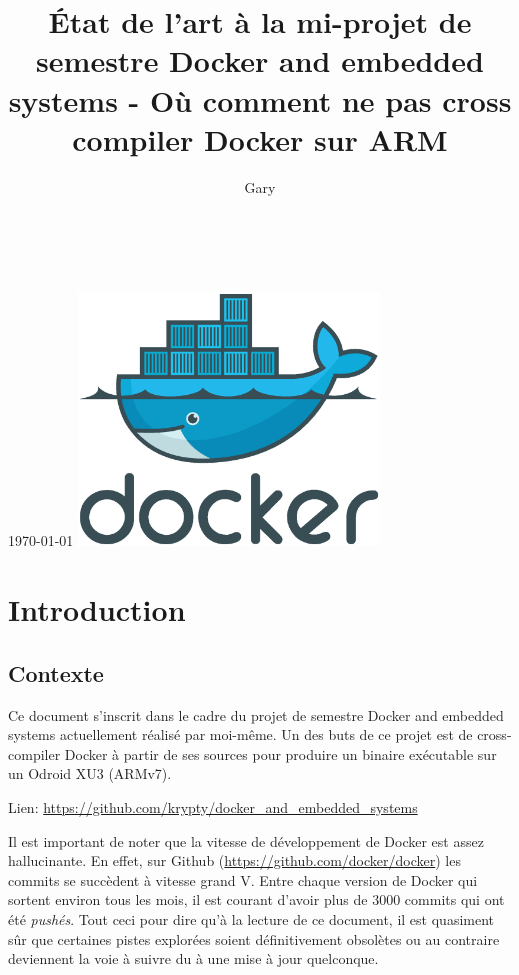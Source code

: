 \documentclass[11pt,a4paper,oneside]{report}
\title{État de l'art à la mi-projet de semestre Docker and embedded systems - Où comment ne pas cross compiler Docker sur ARM}
\author{Gary \bsc{Marigliano}}
\begin{document}
\begin{titlepage}
  \centering
  \vfill
  \LARGE \thetitle\\[0.8cm]

  \Large \theauthor\\[0.8cm]

  \normalsize \today
  \vfill
  \includegraphics[width=8cm]{img/docker_logo}
  \vfill
\end{titlepage}

\tableofcontents
{}

\chapter{Introduction}

\section{Contexte}\label{contexte}

Ce document s'inscrit dans le cadre du projet de semestre Docker and embedded systems actuellement réalisé par moi-même. Un des buts de ce projet est de cross-compiler Docker à partir de ses sources pour produire un binaire exécutable sur un Odroid XU3 (ARMv7).

Lien: \url{https://github.com/krypty/docker_and_embedded_systems}

Il est important de noter que la vitesse de développement de Docker est assez hallucinante. En effet, sur Github (\url{https://github.com/docker/docker}) les commits se succèdent à vitesse grand V. Entre chaque version de Docker qui sortent environ tous les mois, il est courant d'avoir plus de 3000 commits qui ont été \emph{pushés}. Tout ceci pour dire qu'à la lecture de ce document, il est quasiment sûr que certaines pistes explorées soient définitivement obsolètes ou au contraire deviennent la voie à suivre du à une mise à jour quelconque.
\end{document}
